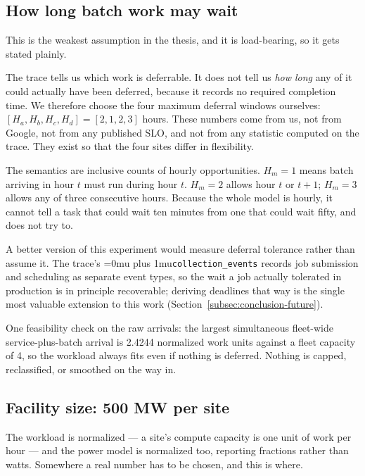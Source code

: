 ﻿\documentclass[12pt]{article}
\newcommand{\codepath}[1]{{\Urlmuskip=0mu plus 1mu\relax\nolinkurl{#1}}}
\begin{document}
\subsection{How long batch work may wait}
\label{subsec:transform-deadlines}

This is the weakest assumption in the thesis, and it is load-bearing, so it gets
stated plainly.

The trace tells us which work is deferrable. It does not tell us \emph{how
long} any of it could actually have been deferred, because it records no
required completion time. We therefore choose the four maximum deferral windows
ourselves:
\([H_a,H_b,H_c,H_d]=[2,1,2,3]\) hours. These numbers come from us, not from
Google, not from any published SLO, and not from any statistic computed on the
trace. They exist so that the four sites differ in flexibility.

The semantics are inclusive counts of hourly opportunities. \(H_m=1\) means
batch arriving in hour \(t\) must run during hour \(t\). \(H_m=2\) allows hour
\(t\) or \(t+1\); \(H_m=3\) allows any of three consecutive hours. Because the
whole model is hourly, it cannot tell a task that could wait ten minutes from
one that could wait fifty, and does not try to.

A better version of this experiment would measure deferral tolerance rather than
assume it. The trace's \codepath{collection_events} records job submission and
scheduling as separate event types, so the wait a job actually tolerated in
production is in principle recoverable; deriving deadlines that way is the
single most valuable extension to this work
(Section~\ref{subsec:conclusion-future}).

One feasibility check on the raw arrivals: the largest simultaneous fleet-wide
service-plus-batch arrival is 2.4244 normalized work units against a fleet
capacity of 4, so the workload always fits even if nothing is deferred. Nothing
is capped, reclassified, or smoothed on the way in.

\subsection{Facility size: 500 MW per site}
\label{subsec:transform-scaling}

The workload is normalized --- a site's compute capacity is one unit of work per
hour --- and the power model is normalized too, reporting fractions rather than
watts. Somewhere a real number has to be chosen, and this is where.
\end{document}
